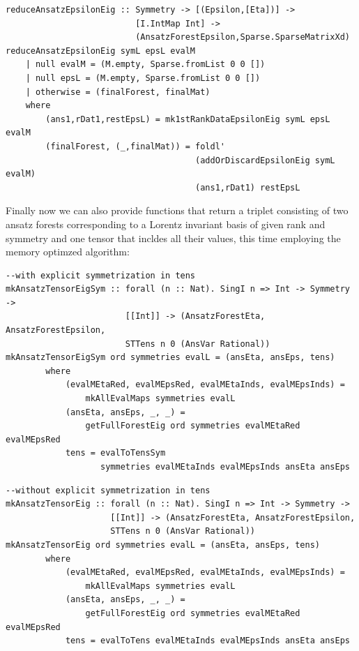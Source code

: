 \documentclass[a4paper,12pt, DIV=14, BCOR=5mm, twoside, headsepline]{scrbook}
\begin{document}
\begin{samepage}
\begin{verbatim}
reduceAnsatzEpsilonEig :: Symmetry -> [(Epsilon,[Eta])] ->
                          [I.IntMap Int] ->
                          (AnsatzForestEpsilon,Sparse.SparseMatrixXd)
reduceAnsatzEpsilonEig symL epsL evalM
    | null evalM = (M.empty, Sparse.fromList 0 0 [])
    | null epsL = (M.empty, Sparse.fromList 0 0 [])
    | otherwise = (finalForest, finalMat)
    where
        (ans1,rDat1,restEpsL) = mk1stRankDataEpsilonEig symL epsL evalM
        (finalForest, (_,finalMat)) = foldl'
                                      (addOrDiscardEpsilonEig symL evalM)
                                      (ans1,rDat1) restEpsL
\end{verbatim} 
\end{samepage}

Finally now we can also provide functions that return a triplet consisting of two ansatz forests corresponding to a Lorentz invariant basis of given rank and symmetry and one tensor that incldes all their values, this time employing the memory optimzed algorithm:

\begin{samepage}
\begin{verbatim}
--with explicit symmetrization in tens
mkAnsatzTensorEigSym :: forall (n :: Nat). SingI n => Int -> Symmetry ->
                        [[Int]] -> (AnsatzForestEta, AnsatzForestEpsilon,
                        STTens n 0 (AnsVar Rational))
mkAnsatzTensorEigSym ord symmetries evalL = (ansEta, ansEps, tens)
        where
            (evalMEtaRed, evalMEpsRed, evalMEtaInds, evalMEpsInds) =
                mkAllEvalMaps symmetries evalL 
            (ansEta, ansEps, _, _) =
                getFullForestEig ord symmetries evalMEtaRed evalMEpsRed
            tens = evalToTensSym
                   symmetries evalMEtaInds evalMEpsInds ansEta ansEps
\end{verbatim} 
\end{samepage}

\begin{samepage}
\begin{verbatim}
--without explicit symmetrization in tens
mkAnsatzTensorEig :: forall (n :: Nat). SingI n => Int -> Symmetry ->
                     [[Int]] -> (AnsatzForestEta, AnsatzForestEpsilon,
                     STTens n 0 (AnsVar Rational))
mkAnsatzTensorEig ord symmetries evalL = (ansEta, ansEps, tens)
        where
            (evalMEtaRed, evalMEpsRed, evalMEtaInds, evalMEpsInds) =
                mkAllEvalMaps symmetries evalL 
            (ansEta, ansEps, _, _) =
                getFullForestEig ord symmetries evalMEtaRed evalMEpsRed
            tens = evalToTens evalMEtaInds evalMEpsInds ansEta ansEps
\end{verbatim} 
\end{samepage}
\end{document}
